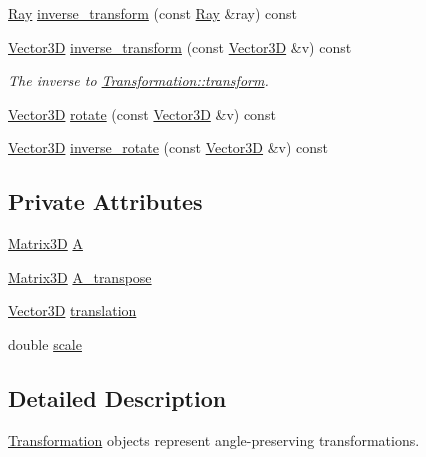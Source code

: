\begin{DoxyCompactItemize}
\item 
\mbox{\hyperlink{classRay}{Ray}} \mbox{\hyperlink{classlinalg_1_1Transformation_a00d24e4118b1a4390ba56950051f2d73}{inverse\+\_\+transform}} (const \mbox{\hyperlink{classRay}{Ray}} \&ray) const
\item 
\mbox{\hyperlink{classVector3D}{Vector3D}} \mbox{\hyperlink{classlinalg_1_1Transformation_a96c21a4793a2d3c2801100d0cb15d894}{inverse\+\_\+transform}} (const \mbox{\hyperlink{classVector3D}{Vector3D}} \&v) const
\begin{DoxyCompactList}\small\item\em The inverse to \mbox{\hyperlink{classlinalg_1_1Transformation_a069ec396b1a3addcb3400797a505b759}{Transformation\+::transform}}. \end{DoxyCompactList}\item 
\mbox{\hyperlink{classVector3D}{Vector3D}} \mbox{\hyperlink{classlinalg_1_1Transformation_ac50039a4713ae9d5b9db7eeb1616d595}{rotate}} (const \mbox{\hyperlink{classVector3D}{Vector3D}} \&v) const
\item 
\mbox{\hyperlink{classVector3D}{Vector3D}} \mbox{\hyperlink{classlinalg_1_1Transformation_a412bea080940292e3b5789e8397fd444}{inverse\+\_\+rotate}} (const \mbox{\hyperlink{classVector3D}{Vector3D}} \&v) const
\end{DoxyCompactItemize}
\subsection*{Private Attributes}
\begin{DoxyCompactItemize}
\item 
\mbox{\hyperlink{classlinalg_1_1Matrix3D}{Matrix3D}} \mbox{\hyperlink{classlinalg_1_1Transformation_a24a75d79007bc9b5c5f32c042fb4332b}{A}}
\item 
\mbox{\hyperlink{classlinalg_1_1Matrix3D}{Matrix3D}} \mbox{\hyperlink{classlinalg_1_1Transformation_ac720d71bf88660e2ae3f3d776c7cfd01}{A\+\_\+transpose}}
\item 
\mbox{\hyperlink{classVector3D}{Vector3D}} \mbox{\hyperlink{classlinalg_1_1Transformation_a462cf5d72735591b01bef5186bb1fe98}{translation}}
\item 
double \mbox{\hyperlink{classlinalg_1_1Transformation_ac627b1362463a8c98fe3b5e633beb049}{scale}}
\end{DoxyCompactItemize}


\subsection{Detailed Description}
\mbox{\hyperlink{classlinalg_1_1Transformation}{Transformation}} objects represent angle-\/preserving transformations. 

